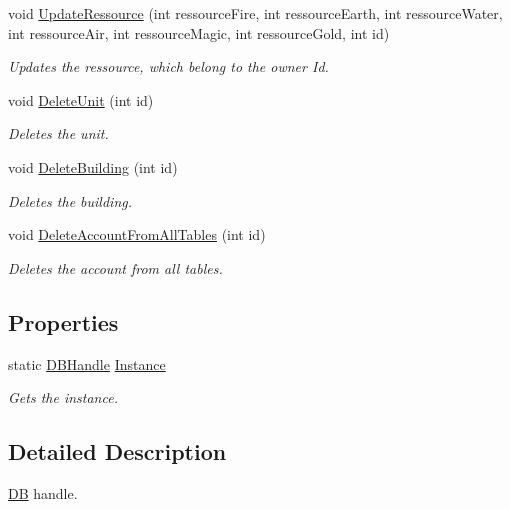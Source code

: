 \begin{DoxyCompactItemize}
void \hyperlink{classServer_1_1DB_1_1DBHandle_a1bd86a76e3ff01f2a378c75dc4cb28d3}{Update\-Ressource} (int ressource\-Fire, int ressource\-Earth, int ressource\-Water, int ressource\-Air, int ressource\-Magic, int ressource\-Gold, int id)
\begin{DoxyCompactList}\small\item\em Updates the ressource, which belong to the owner Id. \end{DoxyCompactList}\item 
void \hyperlink{classServer_1_1DB_1_1DBHandle_a149e5c4a88f7abebe3039ec647c97b00}{Delete\-Unit} (int id)
\begin{DoxyCompactList}\small\item\em Deletes the unit. \end{DoxyCompactList}\item 
void \hyperlink{classServer_1_1DB_1_1DBHandle_a7e3257d50f7e4ae4d2cde720a336711e}{Delete\-Building} (int id)
\begin{DoxyCompactList}\small\item\em Deletes the building. \end{DoxyCompactList}\item 
void \hyperlink{classServer_1_1DB_1_1DBHandle_a6401b9d859f8c7852fd1fb8d08fbcab5}{Delete\-Account\-From\-All\-Tables} (int id)
\begin{DoxyCompactList}\small\item\em Deletes the account from all tables. \end{DoxyCompactList}\end{DoxyCompactItemize}
\subsection*{Properties}
\begin{DoxyCompactItemize}
\item 
static \hyperlink{classServer_1_1DB_1_1DBHandle}{D\-B\-Handle} \hyperlink{classServer_1_1DB_1_1DBHandle_a1809fac85ce06cf9e7f400ac4648051e}{Instance}
\begin{DoxyCompactList}\small\item\em Gets the instance. \end{DoxyCompactList}\end{DoxyCompactItemize}


\subsection{Detailed Description}
\hyperlink{namespaceServer_1_1DB}{D\-B} handle. 



